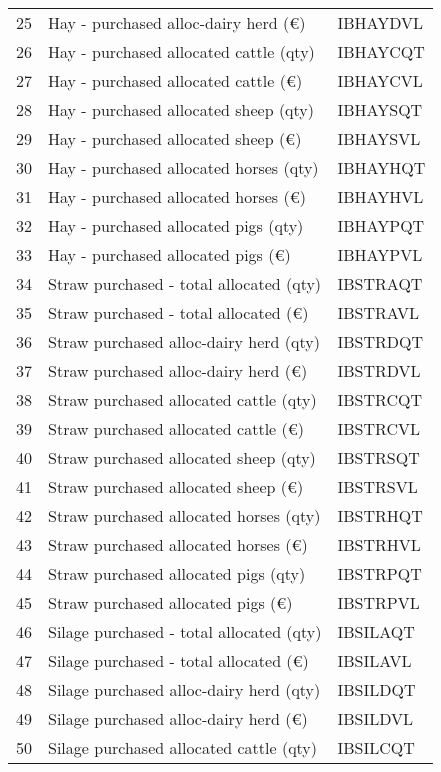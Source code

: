 \documentclass{article}\usepackage{graphicx, color}
\begin{document}
\begin{flushleft}
\begin{table}[ht]
\begin{center}
\begin{tabular}{rll}
  25 & Hay - purchased alloc-dairy herd (€) & IBHAYDVL \\ 
  26 & Hay - purchased allocated cattle (qty) & IBHAYCQT \\ 
  27 & Hay - purchased allocated cattle (€) & IBHAYCVL \\ 
  28 & Hay - purchased allocated sheep  (qty) & IBHAYSQT \\ 
  29 & Hay - purchased allocated sheep  (€) & IBHAYSVL \\ 
  30 & Hay - purchased allocated horses (qty) & IBHAYHQT \\ 
  31 & Hay - purchased allocated horses (€) & IBHAYHVL \\ 
  32 & Hay - purchased allocated pigs   (qty) & IBHAYPQT \\ 
  33 & Hay - purchased allocated pigs   (€) & IBHAYPVL \\ 
  34 & Straw purchased - total allocated  (qty) & IBSTRAQT \\ 
  35 & Straw purchased - total allocated  (€) & IBSTRAVL \\ 
  36 & Straw purchased alloc-dairy herd (qty) & IBSTRDQT \\ 
  37 & Straw purchased alloc-dairy herd (€) & IBSTRDVL \\ 
  38 & Straw purchased allocated cattle (qty) & IBSTRCQT \\ 
  39 & Straw purchased allocated cattle (€) & IBSTRCVL \\ 
  40 & Straw purchased allocated sheep  (qty) & IBSTRSQT \\ 
  41 & Straw purchased allocated sheep  (€) & IBSTRSVL \\ 
  42 & Straw purchased allocated horses (qty) & IBSTRHQT \\ 
  43 & Straw purchased allocated horses (€) & IBSTRHVL \\ 
  44 & Straw purchased allocated pigs   (qty) & IBSTRPQT \\ 
  45 & Straw purchased allocated pigs   (€) & IBSTRPVL \\ 
  46 & Silage purchased - total allocated (qty) & IBSILAQT \\ 
  47 & Silage purchased - total allocated  (€) & IBSILAVL \\ 
  48 & Silage purchased alloc-dairy herd (qty) & IBSILDQT \\ 
  49 & Silage purchased alloc-dairy herd (€) & IBSILDVL \\ 
  50 & Silage purchased allocated cattle (qty) & IBSILCQT \\ 
   \hline
\end{tabular}
\end{center}
\end{table}



\end{flushleft}
\end{document}
